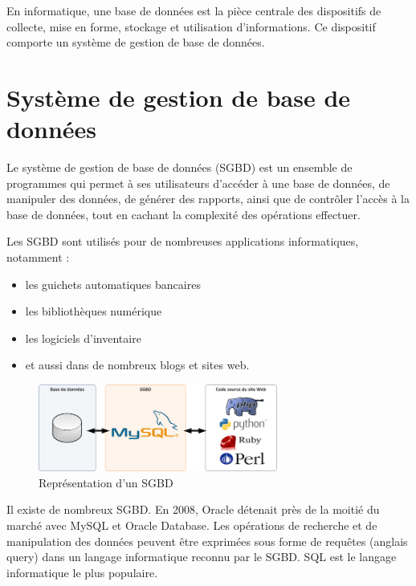\documentclass[oneside,13pt,a4paper]{report}
\begin{document}
            En informatique, une base de données est la pièce centrale des dispositifs de collecte, mise en forme, stockage et utilisation d'informations.
            Ce dispositif comporte un système de gestion de base de données.

        \section{Système de gestion de base de données}
            \label{sgbd}
            Le système de gestion de base de données (SGBD) est un ensemble de programmes qui permet à ses utilisateurs d'accéder à une base de données, 
            de manipuler des données, de générer des rapports, ainsi que de contrôler l'accès à la base de données, 
            tout en cachant la complexité des opérations effectuer.

            Les SGBD sont utilisés pour de nombreuses applications informatiques, notamment : 
            \begin{itemize}
                \item les guichets automatiques bancaires
                \item les bibliothèques numérique
                \item les logiciels d'inventaire
                \item et aussi dans de nombreux blogs et sites web.
            \end{itemize}


            \begin{figure}[h]
                \centering
                \includegraphics[width=0.7\textwidth]{img/sgbd.png}
                \caption{Représentation d'un SGBD}
            \end{figure}

            Il existe de nombreux SGBD. En 2008, Oracle détenait près de la moitié du marché avec MySQL et Oracle Database.
            Les opérations de recherche et de manipulation des données peuvent être exprimées sous forme de requêtes (anglais query) 
            dans un langage informatique reconnu par le SGBD. SQL est le langage informatique le plus populaire.
\end{document}
